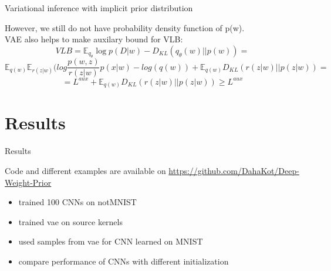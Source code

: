 \documentclass[19pt]{beamer}
\begin{document}
\begin{frame}{Variational inference with implicit prior distribution}

However, we still do not have probability density function of p(w). \\
VAE also helps to make auxilary bound for VLB:\\

$$
VLB = \mathbb{E}_{q_{\theta}} \log p(D \vert w) - D_{KL}(q_{\theta}(w) \vert \vert p(w)) = 
$$
$$
\mathbb{E}_{q(w)} \mathbb{E}_{r(z \vert w)} (log\frac{p(w, z)}{r(z \vert w)}p(x \vert w) - log(q(w)) + \mathbb{E}_{q(w)}D_{KL}(r(z \vert w) \vert \vert p(z \vert w)) =
$$
$$
= L^{aux} +  \mathbb{E}_{q(w)}D_{KL}(r(z \vert w) \vert \vert p(z \vert w)) \geq L^{aux}
$$

\end{frame}

\section{Results}

\begin{frame}{Results}

Code and different examples are available on \url{https://github.com/DahaKot/Deep-Weight-Prior} \\

\begin{itemize}
    \item trained 100 CNNs on notMNIST
    \item trained vae on source kernels
    \item used samples from vae for CNN learned on MNIST
    \item compare performance of CNNs with different initialization
\end{itemize}

\end{frame}
\end{document}
